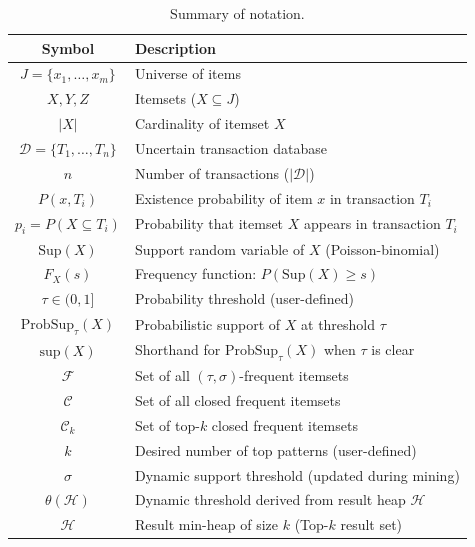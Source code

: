 \documentclass[10pt,letterpaper]{article}
\begin{document}
\begin{table}[H]
\centering
\caption{Summary of notation.}
\label{tab:notation}
\begin{tabular}{|c|l|}
\hline
\textbf{Symbol} & \textbf{Description} \\
\hline
$J = \{x_1,\ldots,x_m\}$      & Universe of items \\
\hline
$X, Y, Z$                      & Itemsets ($X \subseteq J$) \\
\hline
$|X|$                          & Cardinality of itemset $X$ \\
\hline
$\mathcal{D} = \{T_1,\ldots,T_n\}$ & Uncertain transaction database \\
\hline
$n$                            & Number of transactions ($|\mathcal{D}|$) \\
\hline
$P(x, T_i)$                    & Existence probability of item $x$ in transaction $T_i$ \\
\hline
$p_i = P(X \subseteq T_i)$     & Probability that itemset $X$ appears in transaction $T_i$ \\
\hline
$\mathrm{Sup}(X)$              & Support random variable of $X$ (Poisson-binomial) \\
\hline
$F_X(s)$                       & Frequency function: $P(\mathrm{Sup}(X) \ge s)$ \\
\hline
$\tau \in (0,1]$               & Probability threshold (user-defined) \\
\hline
$\mathrm{ProbSup}_\tau(X)$     & Probabilistic support of $X$ at threshold $\tau$ \\
\hline
$\mathrm{sup}(X)$              & Shorthand for $\mathrm{ProbSup}_\tau(X)$ when $\tau$ is clear \\
\hline
$\mathcal{F}$                  & Set of all $(\tau,\sigma)$-frequent itemsets \\
\hline
$\mathcal{C}$                  & Set of all closed frequent itemsets \\
\hline
$\mathcal{C}_k$                & Set of top-$k$ closed frequent itemsets \\
\hline
$k$                            & Desired number of top patterns (user-defined) \\
\hline
$\sigma$                       & Dynamic support threshold (updated during mining) \\
\hline
$\theta(\mathcal{H})$          & Dynamic threshold derived from result heap $\mathcal{H}$ \\
\hline
$\mathcal{H}$                  & Result min-heap of size $k$ (Top-$k$ result set) \\

\end{tabular}
\end{table}
\end{document}
